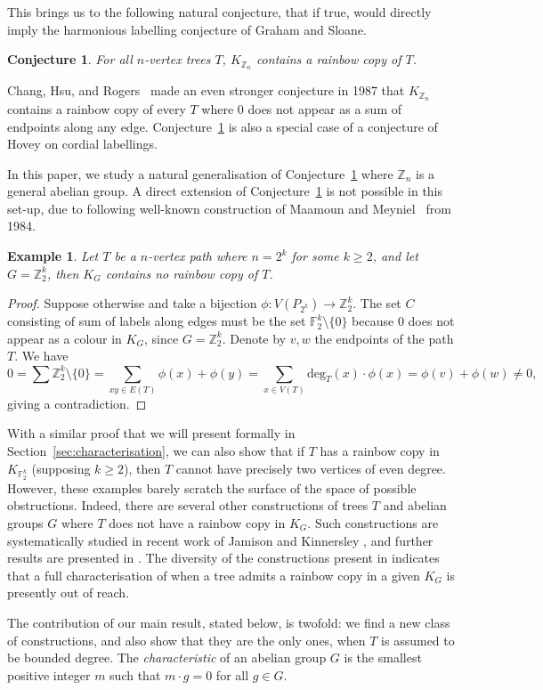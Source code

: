 \documentclass[a4paper,11pt,hidelinks]{amsart}
\newtheorem{conjecture}[theorem]{Conjecture}
\newtheorem{example}[theorem]{Example}
\theoremstyle{definition}
\begin{document}
\par This brings us to the following natural conjecture, that if true, would directly imply the harmonious labelling conjecture of Graham and Sloane.
\begin{conjecture}\label{conj:generalcyclic} For all $n$-vertex trees $T$, $K_{\mathbb{Z}_n}$ contains a rainbow copy of $T$. 
\end{conjecture}
Chang, Hsu, and Rogers~\cite{chang1981additive} made an even stronger conjecture in 1987 that $K_{\mathbb{Z}_n}$ contains a rainbow copy of every $T$ where $0$ does not appear as a sum of endpoints along any edge. Conjecture~\ref{conj:generalcyclic} is also a special case of a conjecture of Hovey \cite{hovey1991cordial} on cordial labellings.
\par In this paper, we study a natural generalisation of Conjecture~\ref{conj:generalcyclic} where $\mathbb{Z}_n$ is a general abelian group. A direct extension of Conjecture~\ref{conj:generalcyclic} is not possible in this set-up, due to following well-known construction of Maamoun and Meyniel~\cite{maamoun1984problem} from 1984.
\begin{example}\label{ex:maamoun} Let $T$ be a $n$-vertex path where $n=2^k$ for some $k\geq 2$, and let $G=\mathbb{Z}_2^k$, then $K_G$ contains no rainbow copy of $T$.
\end{example}
\begin{proof}
    Suppose otherwise and take a bijection $\phi\colon V(P_{2^k})\to \mathbb{Z}_2^k$. The set $C$ consisting of sum of labels along edges must be the set $\mathbb{F}_2^k\setminus \{0\}$ because $0$ does not appear as a colour in $K_G$, since $G=\mathbb{Z}_2^k$. Denote by $v,w$ the endpoints of the path $T$. We have $$0=\sum\mathbb{Z}_2^k\setminus \{0\}  =\sum_{xy\in E(T)}\phi(x)+\phi(y) = \sum_{x\in V(T)}\mathrm{deg}_T(x)\cdot \phi(x) =\phi(v)+\phi(w) \neq 0,$$ giving a contradiction. \end{proof}
With a similar proof that we will present formally in Section~\ref{sec:characterisation}, we can also show that if $T$ has a rainbow copy in $K_{\mathbb{F}_2^k}$ (supposing $k\geq 2$), then $T$ cannot have precisely two vertices of even degree. However, these examples barely scratch the surface of the space of possible obstructions. Indeed, there are several other constructions of trees $T$ and abelian groups $G$ where $T$ does not have a rainbow copy in $K_G$. Such constructions are systematically studied in recent work of Jamison and Kinnersley \cite{jamison2022rainbow}, and further results are presented in \cite{cichacz2025rainbow}. The diversity of the constructions present in \cite{jamison2022rainbow, cichacz2025rainbow} indicates that a full characterisation of when a tree admits a rainbow copy in a given $K_G$ is presently out of reach.
\par The contribution of our main result, stated below, is twofold: we find a new class of constructions, and also show that they are the only ones, when $T$ is assumed to be bounded degree. The \textit{characteristic} of an abelian group $G$ is the
smallest positive integer $m$ such that $m\cdot g = 0$ for all $g\in G$.
\end{document}
